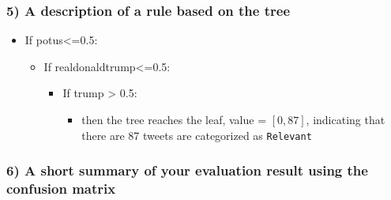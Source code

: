 \documentclass[11pt]{article}
\providecommand{\tightlist}{%
      \setlength{\itemsep}{0pt}\setlength{\parskip}{0pt}}
\begin{document}
    \subsubsection*{5) A description of a rule based on the
tree}\label{a-description-of-a-rule-based-on-the-tree}

    \begin{itemize}
\tightlist
\item
  If potus\textless{}=0.5:

  \begin{itemize}
  \tightlist
  \item
    If realdonaldtrump\textless{}=0.5:

    \begin{itemize}
    \tightlist
    \item
      If trump \textgreater{} 0.5:

      \begin{itemize}
      \tightlist
      \item
        then the tree reaches the leaf, value = \([0, 87]\), indicating
        that there are 87 tweets are categorized as \texttt{Relevant}
      \end{itemize}
    \end{itemize}
  \end{itemize}
\end{itemize}

    \subsubsection*{6) A short summary of your evaluation result using the
confusion
matrix}\label{a-short-summary-of-your-evaluation-result-using-the-confusion-matrix}
\end{document}

